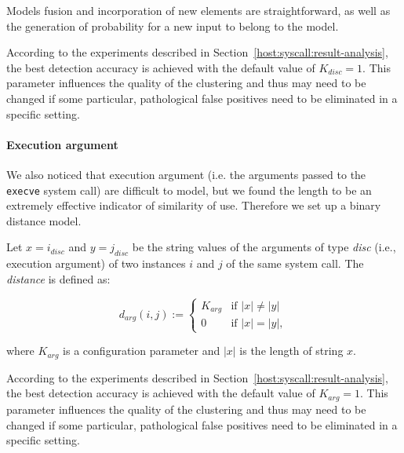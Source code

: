 Models fusion and incorporation of new elements are straightforward,
as well as the generation of probability for a new input to belong to
the model.

\begin{note}
  According to the experiments described in
  Section~\ref{host:syscall:result-analysis}, the best detection
  accuracy is achieved with the default value of $K_{disc} = 1$. This
  parameter influences the quality of the clustering and thus may need
  to be changed if some particular, pathological false positives need
  to be eliminated in a specific setting.
\end{note}

\paragraph{Execution argument}
We also noticed that execution argument (i.e. the arguments passed to
the \texttt{execve} system call) are difficult to model, but we found the
length to be an extremely effective indicator of similarity of
use. Therefore we set up a binary distance model.

\begin{definition}
  Let $x = i_{disc}$ and $y = j_{disc}$ be the string values of the
  arguments of type \emph{disc} (i.e., execution argument) of two
  instances $i$ and $j$ of the same system call. The \emph{distance}
  is defined as:

\begin{displaymath}
  d_{arg}(i,j) := \left\{
    \begin{array}{lll}
      K_{arg} & \mbox{if $|x| \neq |y|$}\\
      0 & \mbox{if $|x| = |y|$},
    \end{array}
  \right.
\end{displaymath}

where $K_{arg}$ is a configuration parameter and $|x|$ is the length
of string $x$.
\end{definition}

\begin{note}
  According to the experiments described in
  Section~\ref{host:syscall:result-analysis}, the best detection
  accuracy is achieved with the default value of $K_{arg} = 1$. This
  parameter influences the quality of the clustering and thus may need
  to be changed if some particular, pathological false positives need
  to be eliminated in a specific setting.
\end{note}

